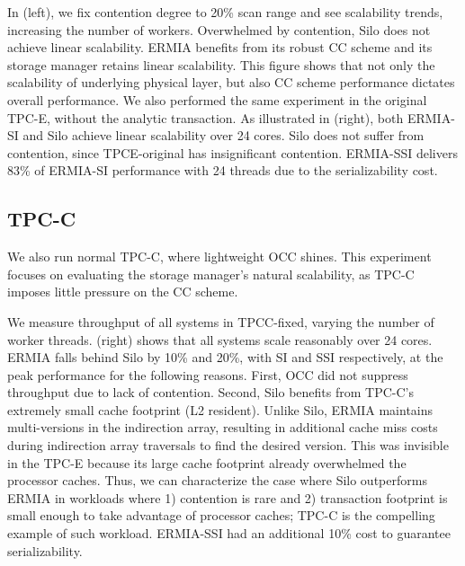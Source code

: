 In  (left), we fix contention degree to 20\% scan range and see scalability trends, increasing the number of workers. Overwhelmed by contention, Silo does not achieve linear scalability. ERMIA benefits from its robust CC scheme and its storage manager retains linear scalability. This figure shows that not only the scalability of underlying physical layer, but also CC scheme performance dictates overall performance. We also performed the same experiment in the original TPC-E, without the analytic transaction. As illustrated in  (right), both ERMIA-SI and Silo achieve linear scalability over 24 cores. Silo does not suffer from contention, since TPCE-original has insignificant contention. ERMIA-SSI delivers 83\% of ERMIA-SI performance with 24 threads due to the serializability cost.

\subsection{TPC-C} 
We also run normal TPC-C, where lightweight OCC shines. This experiment focuses on evaluating the storage manager's natural scalability, as TPC-C imposes little pressure on the CC scheme. 

We measure throughput of all systems in TPCC-fixed, varying the number of worker threads.  (right) shows that all systems scale reasonably over 24 cores. ERMIA falls behind Silo by 10\% and 20\%, with SI and SSI respectively, at the peak performance for the following reasons. First, OCC did not suppress throughput due to lack of contention. Second, Silo benefits from TPC-C's extremely small cache footprint (L2 resident). Unlike Silo, ERMIA maintains multi-versions in the indirection array, resulting in additional cache miss costs during indirection array traversals to find the desired version. This was invisible in the TPC-E because its large cache footprint already overwhelmed the processor caches. Thus, we can characterize the case where Silo outperforms ERMIA in workloads where 1) contention is rare and 2) transaction footprint is small enough to take advantage of processor caches; TPC-C is the compelling example of such workload. ERMIA-SSI had an additional 10\% cost to guarantee serializability.

